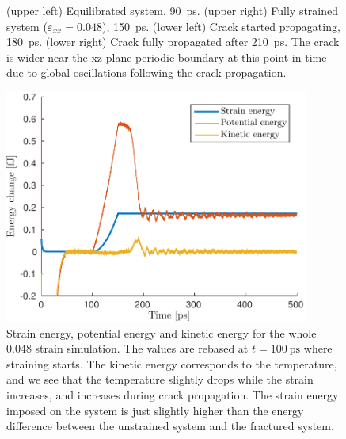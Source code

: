\begin{figure}
\begin{minipage}[b]{0.5\linewidth}
\end{minipage}
\caption{(upper left) Equilibrated system, \SI{90}{\pico\second}. (upper right) Fully strained system ($\varepsilon_{xx} = 0.048$), \SI{150}{\pico\second}. (lower left) Crack started propagating, \SI{180}{\pico\second}. (lower right) Crack fully propagated after \SI{210}{\pico\second}. The crack is wider near the xz-plane periodic boundary at this point in time due to global oscillations following the crack propagation.}
\label{fig:crack_evolution}
\end{figure}


\begin{figure}
\centering
\includegraphics[width=10cm]{../figures/thesis/strain_pot_kin_eng_1048_24_24_12.pdf}
\caption{Strain energy, potential energy and kinetic energy for the whole 0.048 strain simulation. The values are rebased at $t=\SI{100}{\pico\second}$ where straining starts. The kinetic energy corresponds to the temperature, and we see that the temperature slightly drops while the strain increases, and increases during crack propagation. The strain energy imposed on the system is just slightly higher than the energy difference between the unstrained system and the fractured system.}
\label{fig:energy_1048}
\end{figure}

